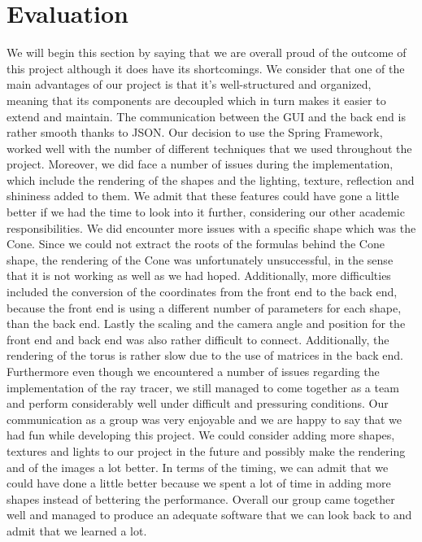 \documentclass[11pt,a4paper]{article}
\begin{document}
\section{Evaluation}
We will begin this section by saying that we are overall proud of the outcome of this project although it does have its shortcomings. We consider that one of the main advantages of our project is that it’s well-structured and organized, meaning that its components are decoupled which in turn makes it easier to extend and maintain. The communication between the GUI and the back end is rather smooth thanks to JSON. Our decision to use the Spring Framework, worked well with the number of different techniques that we used throughout the project. 
Moreover, we did face a number of issues during the implementation, which include the rendering of the shapes and the lighting, texture, reflection and shininess added to them. We admit that these features could have gone a little better if we had the time to look into it further, considering our other academic responsibilities. We did encounter more issues with a specific shape which was the Cone. Since we could not extract the roots of the formulas behind the Cone shape, the rendering of the Cone was unfortunately unsuccessful, in the sense that it is not working as well as we had hoped. 
Additionally, more difficulties included the conversion of the coordinates from the front end to the back end, because the front end is using a different number of parameters for each shape, than the back end. Lastly the scaling and the camera angle and position for the front end and back end was also rather difficult to connect. Additionally, the rendering of the torus is rather slow due to the use of matrices in the back end. 
Furthermore even though we encountered a number of issues regarding the implementation of the ray tracer, we still managed to come together as a team and perform considerably well under difficult and pressuring conditions. Our communication as a group was very enjoyable and we are happy to say that we had fun while developing this project. 
We could consider adding more shapes, textures and lights to our project in the future and possibly make the rendering and of the images a lot better. In terms of the timing, we can admit that we could have done a little better because we spent a lot of time in adding more shapes instead of bettering the performance. 
Overall our group came together well and managed to produce an adequate software that we can look back to and admit that we learned a lot. 
\end{document}
